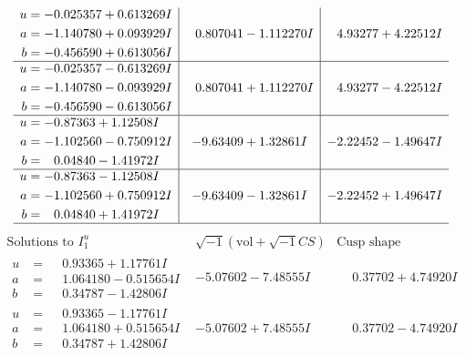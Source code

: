 \documentclass[1p]{elsarticle_modified}
\theoremstyle{definition}
\newcommand{\I}{\sqrt{-1}}
\begin{document}
$$\begin{array}{c|c|c}
\begin{aligned}
u &= -0.025357 + 0.613269 I \\
a &= -1.140780 + 0.093929 I \\
b &= -0.456590 + 0.613056 I\end{aligned}
 & \phantom{-}0.807041 - 1.112270 I & \phantom{-}4.93277 + 4.22512 I \\ \hline\begin{aligned}
u &= -0.025357 - 0.613269 I \\
a &= -1.140780 - 0.093929 I \\
b &= -0.456590 - 0.613056 I\end{aligned}
 & \phantom{-}0.807041 + 1.112270 I & \phantom{-}4.93277 - 4.22512 I \\ \hline\begin{aligned}
u &= -0.87363 + 1.12508 I \\
a &= -1.102560 - 0.750912 I \\
b &= \phantom{-}0.04840 - 1.41972 I\end{aligned}
 & -9.63409 + 1.32861 I & -2.22452 - 1.49647 I \\ \hline\begin{aligned}
u &= -0.87363 - 1.12508 I \\
a &= -1.102560 + 0.750912 I \\
b &= \phantom{-}0.04840 + 1.41972 I\end{aligned}
 & -9.63409 - 1.32861 I & -2.22452 + 1.49647 I\\
 \hline 
 \end{array}$$\newpage$$\begin{array}{c|c|c}  
\text{Solutions to }I^u_{1}& \I (\text{vol} + \sqrt{-1}CS) & \text{Cusp shape}\\
 \hline 
\begin{aligned}
u &= \phantom{-}0.93365 + 1.17761 I \\
a &= \phantom{-}1.064180 - 0.515654 I \\
b &= \phantom{-}0.34787 - 1.42806 I\end{aligned}
 & -5.07602 - 7.48555 I & \phantom{-}0.37702 + 4.74920 I \\ \hline\begin{aligned}
u &= \phantom{-}0.93365 - 1.17761 I \\
a &= \phantom{-}1.064180 + 0.515654 I \\
b &= \phantom{-}0.34787 + 1.42806 I\end{aligned}
 & -5.07602 + 7.48555 I & \phantom{-}0.37702 - 4.74920 I \\ \hline\begin{aligned}

\end{aligned}
\end{array}$$
\end{document}
